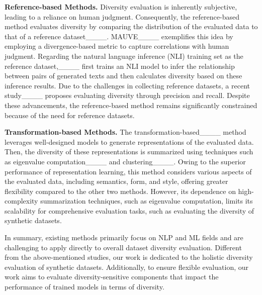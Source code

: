 \textbf{Reference-based Methods.} Diversity evaluation is inherently subjective, leading to a reliance on human judgment. Consequently, the reference-based method evaluates diversity by comparing the distribution of the evaluated data to that of a reference dataset____. MAUVE____ exemplifies this idea by employing a divergence-based metric to capture correlations with human judgment. Regarding the natural language inference (NLI) training set as the reference dataset,____ first trains an NLI model to infer the relationship between pairs of generated texts and then calculates diversity based on these inference results. Due to the challenges in collecting reference datasets, a recent study____ proposes evaluating diversity through precision and recall. Despite these advancements, the reference-based method remains significantly constrained because of the need for reference datasets.

\textbf{Transformation-based Methods.} The transformation-based____ method leverages well-designed models to generate representations of the evaluated data. Then, the diversity of these representations is summarized using techniques such as eigenvalue computation____ and clustering____. 
Owing to the superior performance of representation learning, this method considers various aspects of the evaluated data, including semantics, form, and style, offering greater flexibility compared to the other two methods. However, its dependence on high-complexity summarization techniques, such as eigenvalue computation, limits its scalability for comprehensive evaluation tasks, such as evaluating the diversity of synthetic datasets. 

In summary, existing methods primarily focus on NLP and ML fields and are challenging to apply directly to overall dataset diversity evaluation. Different from the above-mentioned studies, our work is dedicated to the holistic diversity evaluation of synthetic datasets. Additionally, to ensure flexible evaluation, our work aims to evaluate diversity-sensitive components that impact the performance of trained models in terms of diversity.


